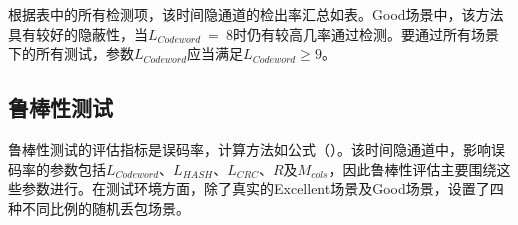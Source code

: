 
根据表中的所有检测项，该时间隐通道的检出率汇总如表。Good场景中，该方法具有较好的隐蔽性，当$L_{Codeword}\ =\ 8$时仍有较高几率通过检测。要通过所有场景下的所有测试，参数$L_{Codeword}$应当满足$L_{Codeword}\ge 9$。

\subsection{鲁棒性测试}
\label{chap:hash:result:robustness}

鲁棒性测试的评估指标是误码率，计算方法如公式（）。该时间隐通道中，影响误码率的参数包括$L_{Codeword}$、$L_{HASH}$、$L_{CRC}$、$R$及$M_{cols}$，因此鲁棒性评估主要围绕这些参数进行。在测试环境方面，除了真实的Excellent场景及Good场景，设置了四种不同比例的随机丢包场景。

